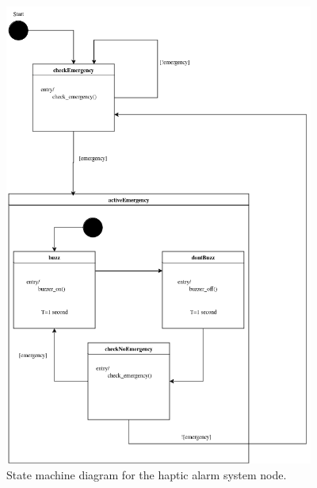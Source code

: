 \begin{figure}[H]
    \centering
    \includegraphics[width=4in]{../assets/HapticAlarmStateMachine.png}
    \caption{State machine diagram for the haptic alarm system node.}
\end{figure}
